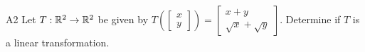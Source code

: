 \documentclass{sbgLAquiz}
\begin{document}
\begin{problem}{A2}
Let $T: \mathbb{R}^2 \rightarrow \mathbb{R}^2$ be given by $T\left(\begin{bmatrix}x \\ y  \end{bmatrix} \right) = \begin{bmatrix} x+y \\ \sqrt{x}+\sqrt{y} \end{bmatrix}$.  Determine if $T$ is a linear transformation.
\end{problem}
\end{document}
